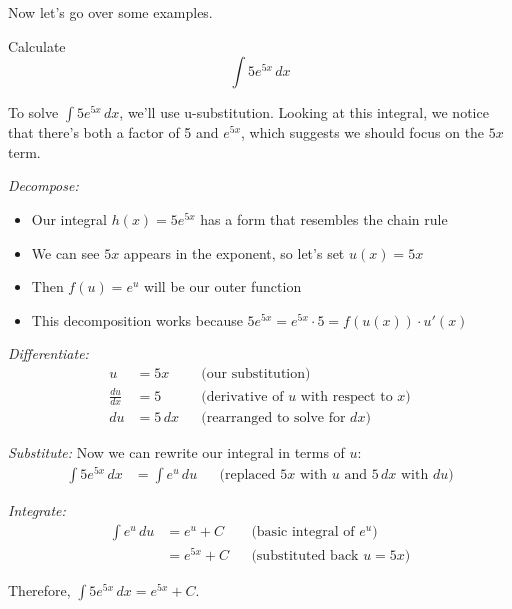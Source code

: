\documentclass{article}
\begin{document}
  Now let's go over some examples. 

  \begin{exercise}
    Calculate 
    \begin{equation}
      \int 5 e^{5x} \,dx
    \end{equation}
  \end{exercise}
  \begin{solution}
    To solve $\int 5e^{5x} \,dx$, we'll use u-substitution. Looking at this integral, we notice that there's both a factor of 5 and $e^{5x}$, which suggests we should focus on the $5x$ term.
    
    \textit{Decompose:}
    \begin{itemize}
      \item Our integral $h(x) = 5e^{5x}$ has a form that resembles the chain rule
      \item We can see $5x$ appears in the exponent, so let's set $u(x) = 5x$
      \item Then $f(u) = e^u$ will be our outer function
      \item This decomposition works because $5e^{5x} = e^{5x} \cdot 5 = f(u(x)) \cdot u'(x)$
    \end{itemize}

    \textit{Differentiate:}
    \begin{align*}
      u &= 5x && \text{(our substitution)} \\
      \frac{du}{dx} &= 5 && \text{(derivative of $u$ with respect to $x$)} \\
      du &= 5\,dx && \text{(rearranged to solve for $dx$)}
    \end{align*}

    \textit{Substitute:}
    Now we can rewrite our integral in terms of $u$:
    \begin{align*}
      \int 5e^{5x} \,dx &= \int e^u \,du && \text{(replaced $5x$ with $u$ and $5\,dx$ with $du$)}
    \end{align*}

    \textit{Integrate:}
    \begin{align*}
      \int e^u \,du &= e^u + C && \text{(basic integral of $e^u$)} \\
      &= e^{5x} + C && \text{(substituted back $u = 5x$)}
    \end{align*}

    Therefore, $\int 5e^{5x} \,dx = e^{5x} + C$.
  \end{solution}
\end{document}
